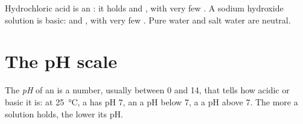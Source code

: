 \begin{example}\label{ex:g9:acids-bases-ph:three}
Hydrochloric acid is an : it holds  and
 , with very few . A sodium hydroxide solution
is basic:  and , with very few . Pure
water and salt water are neutral.
\end{example}

\section{The pH scale}

\begin{definition}[pH]\label{def:g9:acids-bases-ph:ph}
The \emph{pH} of an  is a number, usually
between 0 and 14, that tells how acidic or basic it is: at
\qty{25}{\celsius}, a  has pH 7, an  a pH
below 7, a  a pH above 7. The more   a solution
holds, the lower its pH.
\end{definition}

